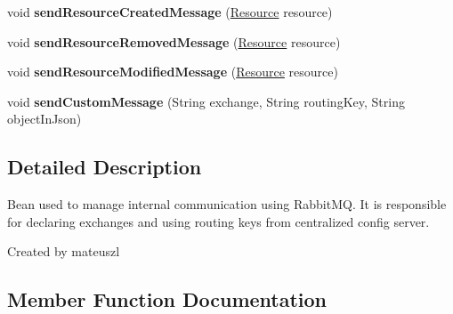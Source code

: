 \begin{DoxyCompactItemize}
\item 
void {\bfseries send\+Resource\+Created\+Message} (\hyperlink{classeu_1_1h2020_1_1symbiote_1_1model_1_1Resource}{Resource} resource)\hypertarget{classeu_1_1h2020_1_1symbiote_1_1messaging_1_1RabbitManager_a1499d1a2def21a1c2a405b1448918da7}{}\label{classeu_1_1h2020_1_1symbiote_1_1messaging_1_1RabbitManager_a1499d1a2def21a1c2a405b1448918da7}

\item 
void {\bfseries send\+Resource\+Removed\+Message} (\hyperlink{classeu_1_1h2020_1_1symbiote_1_1model_1_1Resource}{Resource} resource)\hypertarget{classeu_1_1h2020_1_1symbiote_1_1messaging_1_1RabbitManager_aa77dd12749ba669407cdd928eb7138b6}{}\label{classeu_1_1h2020_1_1symbiote_1_1messaging_1_1RabbitManager_aa77dd12749ba669407cdd928eb7138b6}

\item 
void {\bfseries send\+Resource\+Modified\+Message} (\hyperlink{classeu_1_1h2020_1_1symbiote_1_1model_1_1Resource}{Resource} resource)\hypertarget{classeu_1_1h2020_1_1symbiote_1_1messaging_1_1RabbitManager_a05e443fe0be56a424239727cfed231da}{}\label{classeu_1_1h2020_1_1symbiote_1_1messaging_1_1RabbitManager_a05e443fe0be56a424239727cfed231da}

\item 
void {\bfseries send\+Custom\+Message} (String exchange, String routing\+Key, String object\+In\+Json)\hypertarget{classeu_1_1h2020_1_1symbiote_1_1messaging_1_1RabbitManager_a39ec3510289f5e647eb4dab95f82e127}{}\label{classeu_1_1h2020_1_1symbiote_1_1messaging_1_1RabbitManager_a39ec3510289f5e647eb4dab95f82e127}

\end{DoxyCompactItemize}


\subsection{Detailed Description}
Bean used to manage internal communication using Rabbit\+MQ. It is responsible for declaring exchanges and using routing keys from centralized config server. 

Created by mateuszl 

\subsection{Member Function Documentation}
